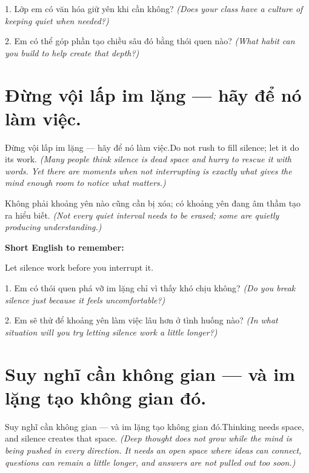 \begin{tuhocnhanh}
1. Lớp em có văn hóa giữ yên khi cần không? \textit{(Does your class have a culture of keeping quiet when needed?)}

2. Em có thể góp phần tạo chiều sâu đó bằng thói quen nào? \textit{(What habit can you build to help create that depth?)}
\end{tuhocnhanh}
\ngancach


\section{Đừng vội lấp im lặng — hãy để nó làm việc.}
\begin{truyen}{Đừng vội lấp im lặng — hãy để nó làm việc.}{Do not rush to fill silence; let it do its work.}
\textit{(Many people think silence is dead space and hurry to rescue it with words. Yet there are moments when not interrupting is exactly what gives the mind enough room to notice what matters.)}
\end{truyen}

\begin{baihoc}
Không phải khoảng yên nào cũng cần bị xóa; có khoảng yên đang âm thầm tạo ra hiểu biết.
\textit{(Not every quiet interval needs to be erased; some are quietly producing understanding.)}
\end{baihoc}

\begin{ghinhoanh}
\textbf{Short English to remember:}

Let silence work before you interrupt it.

\end{ghinhoanh}

\begin{tuhocnhanh}
1. Em có thói quen phá vỡ im lặng chỉ vì thấy khó chịu không? \textit{(Do you break silence just because it feels uncomfortable?)}

2. Em sẽ thử để khoảng yên làm việc lâu hơn ở tình huống nào? \textit{(In what situation will you try letting silence work a little longer?)}
\end{tuhocnhanh}
\ngancach


\section{Suy nghĩ cần không gian — và im lặng tạo không gian đó.}
\begin{truyen}{Suy nghĩ cần không gian — và im lặng tạo không gian đó.}{Thinking needs space, and silence creates that space.}
\textit{(Deep thought does not grow while the mind is being pushed in every direction. It needs an open space where ideas can connect, questions can remain a little longer, and answers are not pulled out too soon.)}
\end{truyen}


